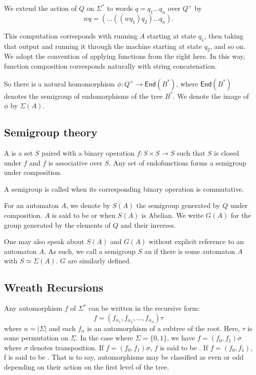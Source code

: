 \documentclass[10pt]{article}
\begin{document}
We extend the action of $Q$ on $\Sigma^*$ to words $q = q_1\ldots q_n$
over $Q^+$ by \[ wq = (\ldots((w q_1) q_2)\ldots q_n). \]

This computation corresponds with running $A$ starting at state $q_1$,
then taking that output and running it through the machine starting at
state $q_2$, and so on. We adopt the convention of applying functions
from the right here. In this way, function composition corresponds
naturally with string concatenation.

So there is a natural homomorphism
$\phi : Q^+ \rightarrow \textsf{End}(B^*)$, where $\textsf{End}(B^*)$
denotes the semigroup of endomorphisms of the tree $B^*$. We denote
the image of $\phi$ by $\Sigma(A)$.

\subsection*{Semigroup theory}

A  is a set $S$ paired with a binary operation
$f : S \times S \rightarrow S$ such that $S$ is closed under $f$ and
$f$ is associative over $S$. Any set of endofunctions forms a
semigroup under composition.

A semigroup is called  when its corresponding binary
operation is commutative.

For an automaton $A$, we denote by $S(A)$ the semigroup generated by
$Q$ under composition. $A$ is said to be  or
 when $S(A)$ is Abelian. We write $G(A)$ for the group
generated by the elements of $Q$ and their inverses.

One may also speak about $S(A)$ and $G(A)$ without explicit reference
to an automaton $A$. As such, we call a semigroup $S$ an
 if there is some automaton $A$ with
$S \simeq \Sigma(A)$.
 $G$ are similarly defined.

\subsection*{Wreath Recursions}
Any automorphism $f$ of $\Sigma^*$ can be written in the recursive form:
\[ f = (f_{\alpha_1}, f_{\alpha_2}, \ldots, f_{\alpha_n})\tau \] where
$n = |\Sigma|$ and each $f_\alpha$ is an automorphism of a subtree of
the root. Here, $\tau$ is some permutation on $\Sigma$. In the case
where $\Sigma = \{0, 1\}$, we have $f = (f_0, f_1)\sigma$ where
$\sigma$ denotes transposition. If $f = (f_0, f_1)\sigma$, $f$ is said
to be . If $f = (f_0, f_1)$, f is said to be
. That is to say, automorphisms may be classified as even
or odd depending on their action on the first level of the tree.
\end{document}
